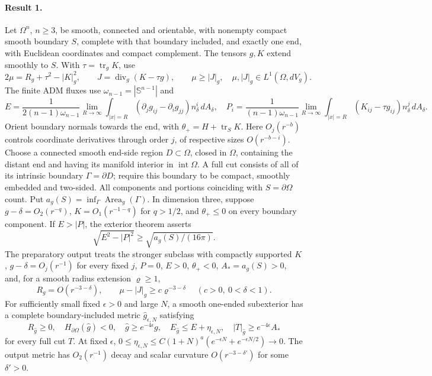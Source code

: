 \documentclass[11pt]{article}
\begin{document}
\paragraph{Result 1.} Let $\Omega^n$, $n\ge3$, be smooth, connected and orientable, with nonempty compact smooth boundary $S$, complete with that boundary included, and exactly one end, with Euclidean coordinates and compact complement. The tensors $g,K$ extend smoothly to $S$. With $\tau=\operatorname{tr}_gK$, use
\[
 2\mu=R_g+\tau^2-|K|_g^2,\qquad J=\operatorname{div}_g(K-\tau g),\qquad
 \mu\ge|J|_g,\quad\mu,|J|_g\in L^1(\Omega,dV_g).
\]
The finite ADM fluxes use $\omega_{n-1}=|\mathbb S^{n-1}|$ and
\[
 E=\frac1{2(n-1)\omega_{n-1}}\lim_{R\to\infty}\int_{|x|=R}
 (\partial_jg_{ij}-\partial_ig_{jj})n_\delta^i\,dA_\delta,\quad
 P_i=\frac1{(n-1)\omega_{n-1}}\lim_{R\to\infty}\int_{|x|=R}(K_{ij}-\tau g_{ij})n_\delta^j\,dA_\delta.
\]
Orient boundary normals towards the end, with $\theta_+=H+\operatorname{tr}_SK$. Here $O_j(r^{-b})$ controls coordinate derivatives through order $j$, of respective sizes $O(r^{-b-i})$. Choose a connected smooth end-side region $D\subset\Omega$, closed in $\Omega$, containing the distant end and having its manifold interior in $\operatorname{int}\Omega$. A full cut consists of all of its intrinsic boundary $\Gamma=\partial D$; require this boundary to be compact, smoothly embedded and two-sided. All components and portions coinciding with $S=\partial\Omega$ count. Put $a_g(S)=\inf_\Gamma\operatorname{Area}_g(\Gamma)$. In dimension three, suppose $g-\delta=O_2(r^{-q})$, $K=O_1(r^{-1-q})$ for $q>1/2$, and $\theta_+\le0$ on every boundary component. If $E>|P|$, the exterior theorem asserts
\[
 \sqrt{E^2-|P|^2}\ge\sqrt{a_g(S)/(16\pi)}.
\]
The preparatory output treats the stronger subclass with compactly supported $K$, $g-\delta=O_j(r^{-1})$ for every fixed $j$, $P=0$, $E>0$, $\theta_+<0$, $A_*=a_g(S)>0$, and, for a smooth radius extension $\varrho\ge1$,
\[
 R_g=O(r^{-3-\delta}),\qquad \mu-|J|_g\ge c\varrho^{-3-\delta}\quad(c>0,\ 0<\delta<1).
\]
For sufficiently small fixed $\epsilon>0$ and large $N$, a smooth one-ended subexterior has a complete boundary-included metric $\widehat g_{\epsilon,N}$ satisfying
\[
 R_{\widehat g}\ge0,\quad H_{\partial\Omega}(\widehat g)<0,\quad
 \widehat g\ge e^{-4\epsilon}g,\quad E_{\widehat g}\le E+\eta_{\epsilon,N},\quad
 |T|_{\widehat g}\ge e^{-4\epsilon}A_*
\]
for every full cut $T$. At fixed $\epsilon$, $0\le\eta_{\epsilon,N}\le C(1+N)^a(e^{-\epsilon N}+e^{-\epsilon N/2})\to0$. The output metric has $O_2(r^{-1})$ decay and scalar curvature $O(r^{-3-\delta'})$ for some $\delta'>0$.
\end{document}
